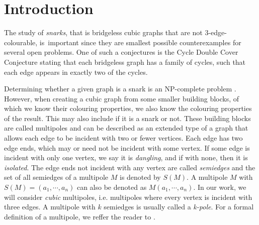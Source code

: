 \section*{Introduction}


The study of \textit{snarks}, that is bridgeless cubic graphs that are not 3-edge-colourable, is~important since they are smallest possible counterexamples for several open problems.
One of such a conjectures is the Cycle Double Cover Conjecture stating that each bridgeless graph has a family of cycles, such that each edge appears in exactly two of the cycles.

Determining whether a given graph is a snark is an NP-complete problem \cite{HolyerNP}. However, when creating a cubic graph from some smaller building blocks, of which we know their colouring properties, we also know the colouring properties of the result. This may also include if it is a snark or not. These building blocks are called multipoles and can be described as an extended type of a graph that allows each edge to be incident with two or fewer vertices. Each edge has two edge ends, which may or need not be incident with some vertex. If some edge is incident with only one vertex, we say it is \textit{dangling}, and if with none, then it is \textit{isolated}. The edge ends not incident with any vertex are called \textit{semiedges} and the set of all semiedges of a multipole $M$ is denoted by $S(M)$.
A multipole $M$ with $S(M) = (a_1, \cdots, a_n)$ can also be denoted as $M(a_1,\cdots,a_n)$.
In our work, we will consider \textit{cubic} multipoles, i.e. multipoles where every vertex is incident with three edges. 
A multipole with $k$ semiedges is usually called a \textit{k-pole}.
For a formal definition of a multipole, we reffer the reader to \cite{TODO}.

